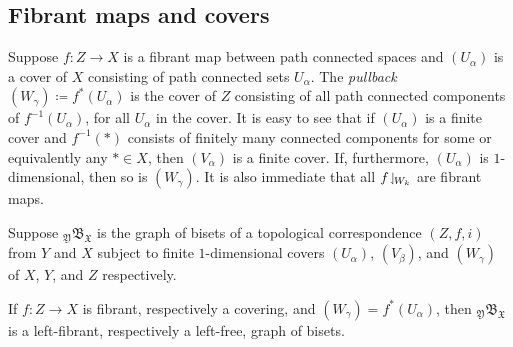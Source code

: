 \documentclass{amsart}
\begin{document}
\subsection{Fibrant maps and covers}
Suppose $f\colon Z\to X$ is a fibrant map between path connected spaces and
$(U_\alpha)$ is a cover of $X$ consisting of path connected sets
$U_\alpha$. The \emph{pullback} $(W_\gamma)\coloneqq f^*(U_\alpha)$ is the
cover of $Z$ consisting of all path connected components of
$f^{-1}(U_\alpha)$, for all $U_\alpha$ in the cover. It is easy to see
that if $(U_\alpha)$ is a finite cover and $f^{-1}(*)$ consists of
finitely many connected components for some or equivalently any $*\in
X$, then $(V_\alpha)$ is a finite cover. If, furthermore, $(U_\alpha)$
is $1$-dimensional, then so is $(W_\gamma)$. It is also immediate that
all $f\!\downharpoonleft_{\!W_k}$ are fibrant maps.
\begin{prop}\label{prop:DecompFibrMaps}
  Suppose ${}_{\mathfrak Y}\mathfrak B_{\mathfrak X}$ is the graph of
  bisets of a topological correspondence $(Z,f,i)$ from $Y$ and $X$
  subject to finite $1$-dimensional covers $(U_\alpha)$, $(V_\beta)$,
  and $(W_\gamma)$ of $X$, $Y$, and $Z$ respectively.
  
  If $f\colon Z\to X$ is fibrant, respectively a covering, and
  $(W_\gamma)=f^*(U_\alpha)$, then ${}_{\mathfrak Y}\mathfrak B_{\mathfrak
    X}$ is a left-fibrant, respectively a left-free, graph of bisets.
\end{prop}
\end{document}
